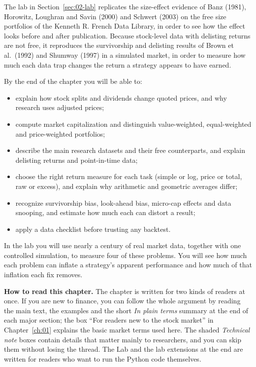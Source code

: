 The lab in Section~\ref{sec:02-lab} replicates the size-effect evidence of Banz (1981), Horowitz, Loughran and Savin (2000) and Schwert (2003) on the free size portfolios of the Kenneth R. French Data Library, in order to see how the effect looks before and after publication. Because stock-level data with delisting returns are not free, it reproduces the survivorship and delisting results of Brown et al.\ (1992) and Shumway (1997) in a simulated market, in order to measure how much each data trap changes the return a strategy appears to have earned.

By the end of the chapter you will be able to:

\begin{itemize}
  \item explain how stock splits and dividends change quoted prices, and why research uses adjusted prices;
  \item compute market capitalization and distinguish value-weighted, equal-weighted and price-weighted portfolios;
  \item describe the main research datasets and their free counterparts, and explain delisting returns and point-in-time data;
  \item choose the right return measure for each task (simple or log, price or total, raw or excess), and explain why arithmetic and geometric averages differ;
  \item recognize survivorship bias, look-ahead bias, micro-cap effects and data snooping, and estimate how much each can distort a result;
  \item apply a data checklist before trusting any backtest.
\end{itemize}

In the lab you will use nearly a century of real market data, together with one controlled simulation, to measure four of these problems. You will see how much each problem can inflate a strategy's apparent performance and how much of that inflation each fix removes.

\begin{callout}
\textbf{How to read this chapter.} The chapter is written for two kinds of readers at once. If you are new to finance, you can follow the whole argument by reading the main text, the examples and the short \emph{In plain terms} summary at the end of each major section; the box ``For readers new to the stock market'' in Chapter~\ref{ch:01} explains the basic market terms used here. The shaded \emph{Technical note} boxes contain details that matter mainly to researchers, and you can skip them without losing the thread. The Lab and the lab extensions at the end are written for readers who want to run the Python code themselves.
\end{callout}

